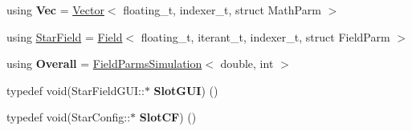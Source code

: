\begin{DoxyCompactItemize}
using {\bfseries Vec} = \hyperlink{structmgs_1_1Vector}{Vector}$<$ floating\+\_\+t, indexer\+\_\+t, struct Math\+Parm $>$
\item 
using \hyperlink{namespacemgs_a7908010cda249b8bf1ea06572a4d4984}{Star\+Field} = \hyperlink{structmgs_1_1Field}{Field}$<$ floating\+\_\+t, iterant\+\_\+t, indexer\+\_\+t, struct Field\+Parm $>$
\item 
\mbox{\label{namespacemgs_a8380a85ccfa5dc1d5e12fbaf619d1d56}} 
using {\bfseries Overall} = \hyperlink{structmgs_1_1FieldParmsSimulation}{Field\+Parms\+Simulation}$<$ double, int $>$
\item 
\mbox{\label{namespacemgs_a153b8282bbe0c4052b4d43f1206f0aff}} 
typedef void(Star\+Field\+G\+U\+I\+::$\ast$ {\bfseries Slot\+G\+UI}) ()
\item 
\mbox{\label{namespacemgs_a4a3e7425a487f54a4f0fcc8e224e6bf5}} 
typedef void(Star\+Config\+::$\ast$ {\bfseries Slot\+CF}) ()
\end{DoxyCompactItemize}
